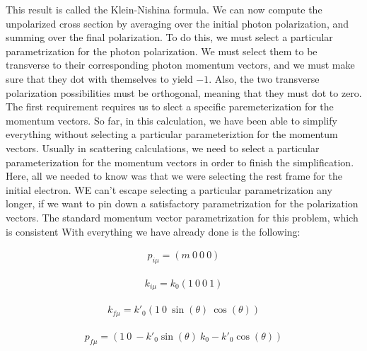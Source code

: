 \documentclass[a4]{article}
\begin{document}
    This result is called the Klein-Nishina formula. We can now compute the unpolarized cross section by averaging over the initial photon polarization, and summing over the final polarization. To do this, we must
    select a particular parametrization for the photon polarization. We must select them to be transverse to their corresponding photon momentum vectors, and we must make sure that they dot with themselves to yield
    $-1$. Also, the two transverse polarization possibilities must be orthogonal, meaning that they must dot to zero. The first requirement requires us to slect a specific paremeterization for the momentum vectors.
    So far, in this calculation, we have been able to simplify everything without selecting a particular parameteriztion for the momentum vectors. Usually in scattering calculations, we need to select a particular
    parameterization for the momentum vectors in order to finish the simplification. Here, all we needed to know was that we were selecting the rest frame for the initial electron. WE can't escape selecting a
    particular parametrization any longer, if we want to pin down a satisfactory parametrization for the polarization vectors. The standard momentum vector parametrization for this problem, which is consistent With
    everything we have already done is the following:

    \begin{equation}
        \begin{aligned}
            p_{i \mu}  = (m \: 0 \: 0 \: 0)
        \end{aligned}
    \end{equation}

    \begin{equation}
        \begin{aligned}
            k_{i \mu}  = k_0 (1 \: 0 \: 0 \: 1)
        \end{aligned}
    \end{equation}

    \begin{equation}
        \begin{aligned}
            k_{f \mu}  = k'_0 (1 \: 0 \: \sin (\theta) \: \cos (\theta) )
        \end{aligned}
    \end{equation}

    \begin{equation}
        \begin{aligned}
            p_{f \mu}  = (1 \: 0 \: -k'_0 \sin (\theta) \: k_0 - k'_0 \cos (\theta) )
        \end{aligned}
    \end{equation}
\end{document}
